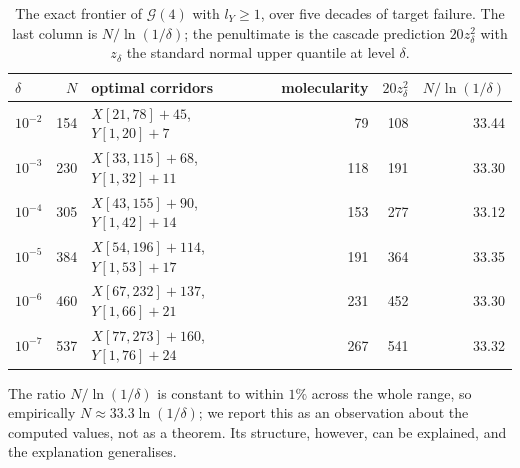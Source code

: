 \documentclass[11pt]{article}
\theoremstyle{plain}
\theoremstyle{definition}
\theoremstyle{remark}
\begin{document}
\begin{table}[t]
\centering\small
\caption{The exact frontier of $\mathcal{G}(4)$ with $l_Y\ge1$, over five
decades of target failure. The last column is $N/\ln(1/\delta)$; the
penultimate is the cascade prediction $20z_\delta^{2}$ with $z_\delta$ the
standard normal upper quantile at level $\delta$.}
\label{tab:scaling}
\begin{tabular}{lrlrrr}
\toprule
$\delta$ & $N$ & optimal corridors & molecularity &
$20z_\delta^{2}$ & $N/\ln(1/\delta)$\\
\midrule
$10^{-2}$ & 154 & $X[21,78]{+}45$, $Y[1,20]{+}7$    & 79  & 108 & 33.44\\
$10^{-3}$ & 230 & $X[33,115]{+}68$, $Y[1,32]{+}11$  & 118 & 191 & 33.30\\
$10^{-4}$ & 305 & $X[43,155]{+}90$, $Y[1,42]{+}14$  & 153 & 277 & 33.12\\
$10^{-5}$ & 384 & $X[54,196]{+}114$, $Y[1,53]{+}17$ & 191 & 364 & 33.35\\
$10^{-6}$ & 460 & $X[67,232]{+}137$, $Y[1,66]{+}21$ & 231 & 452 & 33.30\\
$10^{-7}$ & 537 & $X[77,273]{+}160$, $Y[1,76]{+}24$ & 267 & 541 & 33.32\\
\bottomrule
\end{tabular}
\end{table}

The ratio $N/\ln(1/\delta)$ is constant to within $1\%$ across the whole
range, so empirically $N\approx33.3\ln(1/\delta)$; we report this as an
observation about the computed values, not as a theorem. Its structure,
however, can be explained, and the explanation generalises.
\end{document}

